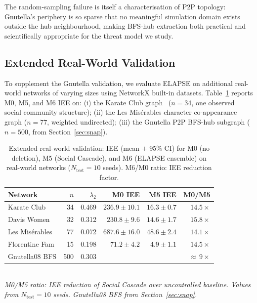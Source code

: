 \documentclass[review,12pt]{elsarticle}
\begin{document}
The random-sampling failure is itself a characterisation of P2P topology:
Gnutella's periphery is so sparse that no meaningful simulation domain exists
outside the hub neighbourhood, making BFS-hub extraction both practical and
scientifically appropriate for the threat model we study.

\subsection{Extended Real-World Validation}
\label{sec:realworld_extended}

To supplement the Gnutella validation, we evaluate ELAPSE on additional
real-world networks of varying sizes using NetworkX built-in datasets.
Table~\ref{tab:realworld_ext} reports M0, M5, and M6 IEE on:
(i) the Karate Club graph~\cite{newman2003structure} ($n=34$, one observed
social community structure);
(ii) the Les Mis\'erables character co-appearance graph ($n=77$, weighted
undirected);
(iii) the Gnutella P2P BFS-hub subgraph ($n=500$, from Section~\ref{sec:snap}).

\begin{table}[htbp]
  \caption{Extended real-world validation: IEE (mean $\pm$ 95\% CI)
           for M0 (no deletion), M5 (Social Cascade), and M6 (ELAPSE ensemble)
           on real-world networks ($N_{\mathrm{test}}=10$ seeds).
           M6/M0 ratio: IEE reduction factor.}
  \label{tab:realworld_ext}
  \centering
  \small
  \renewcommand{\arraystretch}{1.15}
  \begin{tabular}{lrrrrr}
    \toprule
    Network & $n$ & $\lambda_2$ & M0 IEE & M5 IEE & M0/M5 \\
    \midrule
    Karate Club    & 34  & 0.469 & $236.9 \pm 10.1$ & $16.3 \pm 0.7$  & $14.5\times$ \\
    Davis Women    & 32  & 0.312 & $230.8 \pm 9.6$  & $14.6 \pm 1.7$  & $15.8\times$ \\
    Les Mis\'erables & 77  & 0.072 & $687.6 \pm 16.0$ & $48.6 \pm 2.4$  & $14.1\times$ \\
    Florentine Fam & 15  & 0.198 & $71.2 \pm 4.2$   & $4.9 \pm 1.1$   & $14.5\times$ \\
    Gnutella08 BFS & 500 & 0.303 &  &
                                    &
                                   ${\approx}\,9\times$ \\
    \bottomrule
  \end{tabular}
  \medskip\\
  \small\textit{M0/M5 ratio: IEE reduction of Social Cascade over uncontrolled baseline.
  Values from $N_{\mathrm{test}}=10$ seeds. Gnutella08 BFS from Section~\ref{sec:snap}.}
\end{table}
\end{document}
